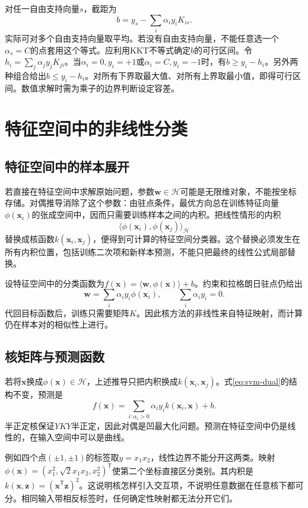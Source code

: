 对任一自由支持向量$s$，截距为
\begin{equation}
 b=y_s-\sum_i\alpha_i y_i K_{is}.
 \label{eq:svm-bias}
\end{equation}
实际可对多个自由支持向量取平均。若没有自由支持向量，不能任意选一个$\alpha_s=C$的点套用这个等式。应利用KKT不等式确定$b$的可行区间。令$h_i=\sum_j\alpha_jy_jK_{ji}$。当$\alpha_i=0,y_i=+1$或$\alpha_i=C,y_i=-1$时，有$b\ge y_i-h_i$。另外两种组合给出$b\le y_i-h_i$。对所有下界取最大值、对所有上界取最小值，即得可行区间。数值求解时需为乘子的边界判断设定容差。

\section{特征空间中的非线性分类}
\subsection{特征空间中的样本展开}
若直接在特征空间中求解原始问题，参数$\bm w\in\mathcal H$可能是无限维对象，不能按坐标存储。对偶推导消除了这个参数：由驻点条件，最优方向总在训练特征向量$\phi(\bm x_i)$的张成空间中，因而只需要训练样本之间的内积。把线性情形的内积
\[
 \langle\phi(\bm x_i),\phi(\bm x_j)\rangle_{\mathcal H}
\]
替换成核函数$k(\bm x_i,\bm x_j)$，便得到可计算的特征空间分类器。这个替换必须发生在所有内积位置，包括训练二次项和新样本预测，不能只把最终的线性公式局部替换。

设特征空间中的分类函数为$f(\bm x)=\langle\bm w,\phi(\bm x)\rangle+b$。约束和拉格朗日驻点仍给出
\begin{equation}
 \bm w=\sum_i\alpha_i y_i\phi(\bm x_i),
 \qquad \sum_i\alpha_i y_i=0.
 \label{eq:svm-feature-space-representer}
\end{equation}
代回目标函数后，训练只需要矩阵$K$。因此核方法的非线性来自特征映射，而计算仍在样本对的相似性上进行。

\subsection{核矩阵与预测函数}
若将$\bm x$换成$\phi(\bm x)\in\mathcal H$，上述推导只把内积换成$k(\bm x_i,\bm x_j)$。式\eqref{eq:svm-dual}的结构不变，预测是
\begin{equation}
 f(\bm x)=\sum_{i:\alpha_i>0}\alpha_i y_i k(\bm x_i,\bm x)+b.
\end{equation}
半正定核保证$YKY$半正定，因此对偶是凹最大化问题。预测在特征空间中仍是线性的，在输入空间中可以是曲线。

例如四个点$(\pm1,\pm1)$的标签取$y=x_1x_2$，线性边界不能分开这两类。映射$\phi(\bm x)=(x_1^2,\sqrt2x_1x_2,x_2^2)^{\mathsf T}$使第二个坐标直接区分类别。其内积是$k(\bm x,\bm z)=(\bm x^{\mathsf T}\bm z)^2$。这说明核怎样引入交互项，不说明任意数据在任意核下都可分。相同输入带相反标签时，任何确定性映射都无法分开它们。

